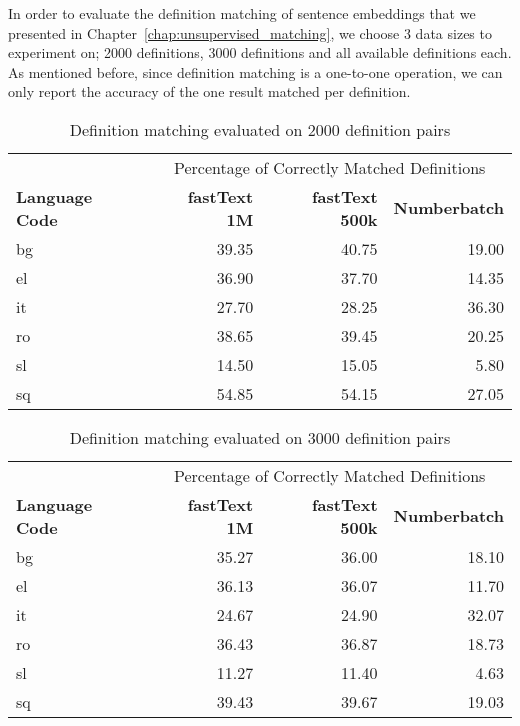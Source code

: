 In order to evaluate the definition matching of sentence embeddings that we presented in Chapter~\ref{chap:unsupervised_matching}, we choose 3 data sizes to experiment on; 2000 definitions, 3000 definitions and all available definitions each.
As mentioned before, since definition matching is a one-to-one operation, we can only report the accuracy of the one result matched per definition.

\begin{table}[htbp]
    \centering
    \begin{tabular}{lrrr}
        \toprule
& \multicolumn{3}{c}{Percentage of Correctly Matched Definitions} \\
\cmidrule(lr){2-4}
        \textbf{Language Code} & \textbf{fastText 1M} & \textbf{fastText 500k} & \textbf{Numberbatch} \\
        \midrule
        bg & 39.35 & 40.75 & 19.00 \\
        el & 36.90 & 37.70 & 14.35 \\
        it & 27.70 & 28.25 & 36.30 \\
        ro & 38.65 & 39.45 & 20.25 \\
        sl & 14.50 & 15.05 & 5.80 \\
        sq & 54.85 & 54.15 & 27.05 \\
        \bottomrule
    \end{tabular}
    \caption{Definition matching evaluated on 2000 definition pairs}%
    \label{tab:lapjv_2000}
\end{table}

\begin{table}[htbp]
    \centering
    \begin{tabular}{lrrr}
        \toprule
& \multicolumn{3}{c}{Percentage of Correctly Matched Definitions} \\
\cmidrule(lr){2-4}
        \textbf{Language Code} & \textbf{fastText 1M} & \textbf{fastText 500k} & \textbf{Numberbatch} \\
        \midrule
        bg & 35.27 & 36.00 & 18.10 \\
        el & 36.13 & 36.07 & 11.70 \\
        it & 24.67 & 24.90 & 32.07 \\
        ro & 36.43 & 36.87 & 18.73 \\
        sl & 11.27 & 11.40 & 4.63 \\
        sq & 39.43 & 39.67 & 19.03 \\
        \bottomrule
    \end{tabular}
    \caption{Definition matching evaluated on 3000 definition pairs}%
    \label{tab:lapjv_3000}
\end{table}

